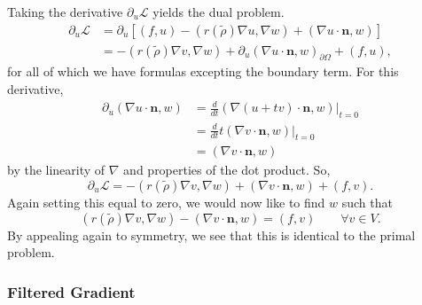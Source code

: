 Taking the derivative $\partial_u \mathcal{L}$ yields the dual problem.
\begin{align*}
    \partial_{u} \mathcal{L} &= \partial_{u} \left[ (f,u) -(r(\tilde{\rho}) \nabla u, \nabla w) + (\nabla u \cdot \mathbf{n}, w) \right]\\
        &= -(r(\tilde{\rho}) \nabla v, \nabla w) + \partial_u(\nabla u \cdot \mathbf{n}, w)_{\partial\Omega} + (f,u),
\end{align*}
for all of which we have formulas excepting the boundary term. For this derivative,
\begin{align*}
    \partial_u (\nabla u \cdot \mathbf{n}, w) &= \frac{d}{dt} (\nabla(u + tv)\cdot\mathbf{n}, w) \bigg|_{t=0}\\
        &= \frac{d}{dt} t(\nabla v \cdot \mathbf{n}, w) \bigg|_{t=0}\\
        &= (\nabla v \cdot \mathbf{n}, w)
\end{align*}
by the linearity of $\nabla$ and properties of the dot product. So,
\begin{equation*}
    \partial_u \mathcal{L} = -(r(\tilde{\rho}) \nabla v, \nabla w) + (\nabla v \cdot \mathbf{n}, w) + (f,v).
\end{equation*}
Again setting this equal to zero, we would now like to find $w$ such that
\begin{equation*}
    (r(\tilde{\rho}) \nabla v, \nabla w) - (\nabla v \cdot \mathbf{n}, w) = (f,v) \qquad \forall v \in V.
\end{equation*}
By appealing again to symmetry, we see that this is identical to the primal problem.

\subsubsection{Filtered Gradient}

